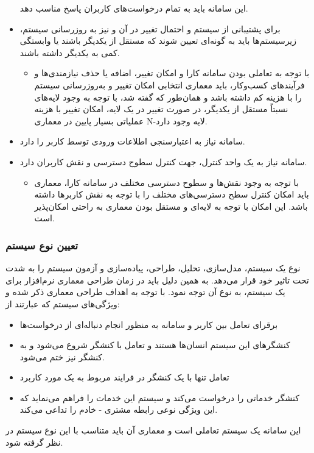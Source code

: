 \documentclass[12pt]{article}
\begin{document}
\begin{itemize}
		این سامانه باید به تمام درخواست‌های کاربران پاسخ مناسب دهد.
		\item
		برای پشتیبانی از سیستم و احتمال تغییر در آن و نیز به روزرسانی سیستم، زیرسیستم‌ها باید به گونه‌ای تعیین شوند که مستقل از یکدیگر باشند یا وابستگی کمی به یکدیگر داشته باشند.
		\begin{itemize}
			\item
			با توجه به تعاملی بودن سامانه کارا و امکان تغییر، اضافه یا حذف نیازمندی‌ها و فرآیند‌های کسب‌و‌کار، باید معماری انتخابی امکان تغییر و به‌روزرسانی سیستم را با هزینه کم داشته باشد و همان‌طور که گفته شد، با توجه به وجود لایه‌های نسبتاً مستقل از یکدیگر، در صورت تغییر در یک لایه، امکان تغییر با هزینه عملیاتی بسیار پایین در معماری N-لایه وجود دارد.
		\end{itemize}
		\item
		سامانه نیاز به اعتبارسنجی اطلاعات ورودی توسط کاربر را دارد.
		\item
		سامانه نیاز به یک واحد کنترل، جهت کنترل سطوح دسترسی و نقش کاربران دارد.
		\begin{itemize}
			\item
			با توجه به وجود نقش‌ها و سطوح دسترسی مختلف در سامانه کارا، معماری باید امکان کنترل سطح دسترسی‌های‌ مختلف را با توجه به نقش کاربر‌ها داشته باشد. این امکان با توجه به لایه‌ای و مستقل بودن معماری به راحتی امکان‌پذیر است.
		\end{itemize}
	\end{itemize}

	\subsubsection{تعیین نوع سیستم}
	نوع یک سیستم، مدل‌سازی، تحلیل، طراحی، پیاده‌سازی و آزمون سیستم را به شدت تحت تاثیر خود قرار می‌دهد. به همین دلیل باید در زمان طراحی معماری نرم‌افزار برای یک سیستم، به نوع آن توجه نمود.
	با توجه به اهداف طراحی معماری ذکر شده و ویژگی‌های سیستم که عبارتند از:

	\begin{itemize}
		\item برقرای تعامل بین کاربر و سامانه به منظور انجام دنباله‌ای از درخواست‌ها
		\item کنشگرهای این سیستم انسان‌ها هستند و تعامل با کنشگر شروع می‌شود و به کنشگر نیز ختم می‌شود.
		\item تعامل تنها با یک کنشگر در فرایند مربوط به یک مورد کاربرد
		\item کنشگر خدماتی را درخواست می‌کند و سیستم این خدمات را فراهم می‌نماید که این ویژگی نوعی رابطه مشتری - خادم را تداعی می‌کند.
	\end{itemize}
	این سامانه یک سیستم تعاملی است و معماری آن باید متناسب با این نوع سیستم در نظر گرفته شود.
\end{document}
